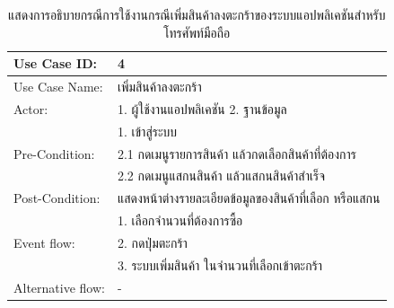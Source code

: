 \begin{table}[htbp]
  \centering
  \caption{แสดงการอธิบายกรณีการใช้งานกรณีเพิ่มสินค้าลงตะกร้าของระบบแอปพลิเคชันสำหรับโทรศัพท์มือถือ}
  \begin{tabularx}{\textwidth}{|p{3cm}|X|}
    \hline
    \multirow{1}{3cm}{Use Case ID:}      & 4                                           \\
    \hline
    \multirow{1}{3cm}{Use Case Name:}    & เพิ่มสินค้าลงตะกร้า                              \\
    \hline
    \multirow{1}{3cm}{Actor:}            & 1. ผู้ใช้งานแอปพลิเคชัน 2. ฐานข้อมูล               \\
    \hline
    \multirow{3}{3cm}{Pre-Condition:}    & 1. เข้าสู่ระบบ                                 \\ & 2.1 กดเมนูรายการสินค้า แล้วกดเลือกสินค้าที่ต้องการ \\
                                         & 2.2 กดเมนูแสกนสินค้า แล้วแสกนสินค้าสำเร็จ           \\
    \hline
    \multirow{1}{3cm}{Post-Condition:}   & แสดงหน้าต่างรายละเอียดข้อมูลของสินค้าที่เลือก หรือแสกน \\
    \hline
    \multirow{3}{3cm}{Event flow:}       & 1. เลือกจำนวนที่ต้องการซื้อ                        \\
                                         & 2. กดปุ่มตะกร้า                                \\ & 3. ระบบเพิ่มสินค้า ในจำนวนที่เลือกเข้าตะกร้า \\
    \hline
    \multirow{1}{3cm}{Alternative flow:} & -                                           \\
    \hline
  \end{tabularx}
\end{table}

